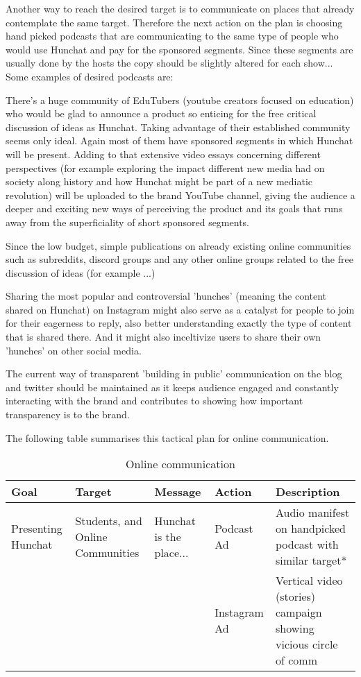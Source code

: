 \documentclass[12pt]{article}
\begin{document}
	Another way to reach the desired target is to communicate on places that already contemplate the same target. Therefore the next action on the plan is choosing hand picked podcasts that are communicating to the same type of people who would use Hunchat and pay for the sponsored segments. Since these segments are usually done by the hosts the copy should be slightly altered for each show... Some examples of desired podcasts are: 
	
	There's a huge community of EduTubers (youtube creators focused on education) who would be glad to announce a product so enticing for the free critical discussion of ideas as Hunchat. Taking advantage of their established community seems only ideal. Again most of them have sponsored segments in which Hunchat will be present. Adding to that extensive video essays concerning different perspectives (for example exploring the impact different new media had on society along history and how Hunchat might be part of a new mediatic revolution) will be uploaded to the brand YouTube channel, giving the audience a deeper and exciting new ways of perceiving the product and its goals that runs away from the superficiality of short sponsored segments.
	
	Since the low budget, simple publications on already existing online communities such as subreddits, discord groups and any other online groups related to the free discussion of ideas (for example ...)
	
	Sharing the most popular and controversial 'hunches' (meaning the content shared on Hunchat) on Instagram might also serve as a catalyst for people to join for their eagerness to reply, also better understanding exactly the type of content that is shared there. And it might also inceltivize users to share their own 'hunches' on other social media.

	The current way of transparent 'building in public' communication on the blog and twitter should be maintained as it keeps audience engaged and constantly interacting with the brand and contributes to showing how important transparency is to the brand.
	
	The following table summarises this tactical plan for online communication.
	
	\begin{table}[htbp]
	\small
	\caption{Online communication}
	\label{table:online}
	\centering
	\begin{tabular}{ @{}P{0.12\textwidth}P{0.15\textwidth}P{0.18\textwidth}P{0.1\textwidth}P{0.35\textwidth}@{} }
Goal	&	Target	&	Message	&	Action	&	Description	 \\ \hline
Presenting Hunchat	&	Students, and Online Communities 	& Hunchat is the place... & 	Podcast Ad & Audio manifest on handpicked podcast with similar target* \\
	& 	&	& Instagram Ad & Vertical video (stories) campaign showing vicious circle of comm
 	\\ \hline
	\end{tabular}
	\end{table}
	
\end{document}
